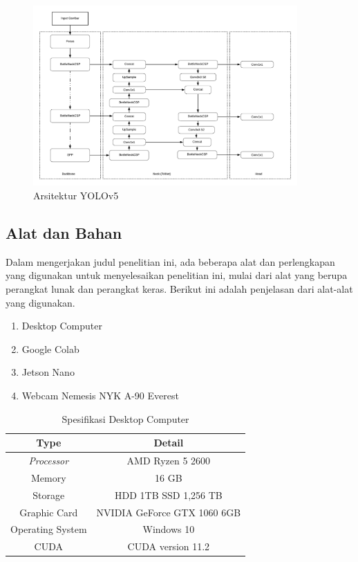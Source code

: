 \begin{figure} [ht]
  \centering
  \includegraphics[width=0.9\textwidth]{gambar/yolov5 structure.png}

  \caption{Arsitektur YOLOv5}
  \label{fig:yolov5network}
\end{figure}

\subsection{Alat dan Bahan}
\label{subsec:toolsandequipment}

\par Dalam mengerjakan judul penelitian ini, ada beberapa alat dan perlengkapan yang digunakan untuk menyelesaikan penelitian ini, mulai dari alat yang berupa perangkat lunak dan perangkat keras. Berikut ini adalah penjelasan dari alat-alat yang digunakan.

\begin{enumerate}[nolistsep]
  \item Desktop Computer
  \item Google Colab
  \item Jetson Nano
  \item Webcam Nemesis NYK A-90 Everest
\end{enumerate}

\begin{table} [ht]
  \caption{Spesifikasi Desktop Computer}
  \label{tab:desktopspec}
  \centering
  \begin{tabular}{|c|c|}
    \hline
    \textbf{Type} & \textbf{Detail}  \\
    \hline
    \textit{Processor} & AMD Ryzen 5 2600 \\ 
    Memory             & 16 GB  \\
    Storage            & HDD 1TB SSD 1,256 TB\\
    Graphic Card       & NVIDIA GeForce GTX 1060 6GB \\
    Operating System   & Windows 10     \\
    CUDA               & CUDA version 11.2    \\              
    \hline
  \end{tabular}
\end{table}

